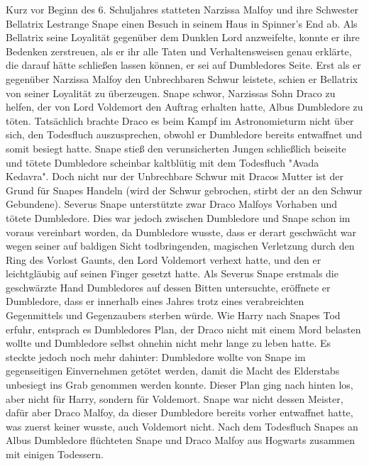 \documentclass[a4paper, 10pt]{article}
\begin{document}
Kurz vor Beginn des 6. Schuljahres statteten Narzissa Malfoy und ihre Schwester Bellatrix Lestrange Snape einen Besuch in seinem Haus in Spinner’s End ab. Als Bellatrix seine Loyalität gegenüber dem Dunklen Lord anzweifelte, konnte er ihre Bedenken zerstreuen, als er ihr alle Taten und Verhaltensweisen genau erklärte, die darauf hätte schließen lassen können, er sei auf Dumbledores Seite. Erst als er gegenüber Narzissa Malfoy den Unbrechbaren Schwur leistete, schien er Bellatrix von seiner Loyalität zu überzeugen. Snape schwor, Narzissas Sohn Draco zu helfen, der von Lord Voldemort den Auftrag erhalten hatte, Albus Dumbledore zu töten. Tatsächlich brachte Draco es beim Kampf im Astronomieturm nicht über sich, den Todesfluch auszusprechen, obwohl er Dumbledore bereits entwaffnet und somit besiegt hatte. Snape stieß den verunsicherten Jungen schließlich beiseite und tötete Dumbledore scheinbar kaltblütig mit dem Todesfluch "Avada Kedavra". Doch nicht nur der Unbrechbare Schwur mit Dracos Mutter ist der Grund für Snapes Handeln (wird der Schwur gebrochen, stirbt der an den Schwur Gebundene). Severus Snape unterstützte zwar Draco Malfoys Vorhaben und tötete Dumbledore. Dies war jedoch zwischen Dumbledore und Snape schon im voraus vereinbart worden, da Dumbledore wusste, dass er derart geschwächt war wegen seiner auf baldigen Sicht todbringenden, magischen Verletzung durch den Ring des Vorlost Gaunts, den Lord Voldemort verhext hatte, und den er leichtgläubig auf seinen Finger gesetzt hatte. Als Severus Snape erstmals die geschwärzte Hand Dumbledores auf dessen Bitten untersuchte, eröffnete er Dumbledore, dass er innerhalb eines Jahres trotz eines verabreichten Gegenmittels und Gegenzaubers sterben würde. Wie Harry nach Snapes Tod erfuhr, entsprach es Dumbledores Plan, der Draco nicht mit einem Mord belasten wollte und Dumbledore selbst ohnehin nicht mehr lange zu leben hatte. Es steckte jedoch noch mehr dahinter: Dumbledore wollte von Snape im gegenseitigen Einvernehmen getötet werden, damit die Macht des Elderstabs unbesiegt ins Grab genommen werden konnte. Dieser Plan ging nach hinten los, aber nicht für Harry, sondern für Voldemort. Snape war nicht dessen Meister, dafür aber Draco Malfoy, da dieser Dumbledore bereits vorher entwaffnet hatte, was zuerst keiner wusste, auch Voldemort nicht. Nach dem Todesfluch Snapes an Albus Dumbledore flüchteten Snape und Draco Malfoy aus Hogwarts zusammen mit einigen Todessern.
\end{document}
